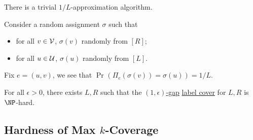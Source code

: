 \begin{remark}[Baseline]
	There is a trivial \(1/L\)-approximation algorithm.
\end{remark}
\begin{explanation}
	Consider a random assignment \(\sigma \) such that
	\begin{itemize}
		\item for all \(v\in \mathcal{\MakeUppercase{v}} \), \(\sigma (v)\) randomly from \([R]\);
		\item for all \(u\in \mathcal{\MakeUppercase{u}} \), \(\sigma (u)\) randomly from \([L]\).
	\end{itemize}
	Fix \(e=(u, v)\), we see that \(\Pr_{}(\Pi _e(\sigma (v)) = \sigma (u)) = 1 / L \).
\end{explanation}

\begin{theorem}
	For all \(\epsilon > 0\), there exists \(L, R\) such that the \hyperref[def:c-s-gap]{\((1, \epsilon )\)-gap} \hyperref[prb:label-cover]{label cover} for \(L, R\) is \(\NP\)-hard.
\end{theorem}

\subsection{Hardness of Max \(k\)-Coverage}


